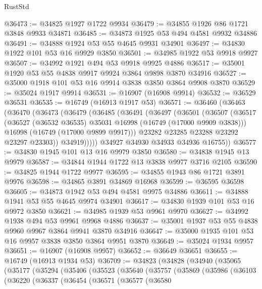 \begin{lexlean}{RustStd}
\begin{coremodule}
@36473 := @34825 @1927 @1722 @9934
@36479 := @34855 @1926 @86 @1721 @3848 @9933 @34871
@36485 := @34873 @1925 @53 @494 @4581 @9932 @34886
@36491 := @34888 @1924 @53 @55 @4645 @9931 @34901
@36497 := @34830 @1922 @101 @53 @16 @9929 @3850
@36501 := @34985 @1922 @53 @9918 @9927
@36507 := @34992 @1921 @494 @53 @9918 @9925 @4886
@36517 := @35001 @1920 @53 @55 @4838 @9917 @9924 @3864 @9898 @3870 @34916
@36527 := @35000 @1918 @101 @53 @16 @9914 @3838 @3850 @3864 @9908 @3870
@36529 := @35024 @1917 @9914
@36531 := @16907 (@16908 @9914)
@36532 := @36529 @36531
@36535 := @16749 (@16913 @1917 @53)
@36571 := @36460
    (@36463
      (@36470
        (@36473
          (@36479
            (@36485
              (@36491
                (@36497
                  (@36501
                    (@36507
                      (@36517
                        (@36527 (@36532 @36535) @35031 @16998 (@16749 (@17000 @9909 @3838)))
                        @16998
                        (@16749 (@17000 @9899 @9917)))
                      @23282
                      @23285
                      @23288
                      @23292
                      @23297
                      @23303))
                  @34919)))))
        @34927
        @34930
        @34933
        @34936
        @16755))
@36577 := @34830 @1945 @101 @13 @16 @9979 @3850
@36580 := @34838 @1945 @13 @9979
@36587 := @34844 @1944 @1722 @13 @3838 @9977 @3716 @2105
@36590 := @34825 @1944 @1722 @9977
@36595 := @34855 @1943 @86 @1721 @3891 @9976
@36598 := @34865 @3891 @34869 @16968
@36599 := @36595 @36598
@36605 := @34873 @1942 @53 @494 @4581 @9975 @34886
@36611 := @34888 @1941 @53 @55 @4645 @9974 @34901
@36617 := @34830 @1939 @101 @53 @16 @9972 @3850
@36621 := @34985 @1939 @53 @9961 @9970
@36627 := @34992 @1938 @494 @53 @9961 @9968 @4886
@36637 := @35001 @1937 @53 @55 @4838 @9960 @9967 @3864 @9941 @3870 @34916
@36647 := @35000 @1935 @101 @53 @16 @9957 @3838 @3850 @3864 @9951 @3870
@36649 := @35024 @1934 @9957
@36651 := @16907 (@16908 @9957)
@36652 := @36649 @36651
@36655 := @16749 (@16913 @1934 @53)
@36709 := @34823
    (@34828
      (@34940
        (@35065
          (@35177
            (@35294
              (@35406
                (@35523
                  (@35640
                    (@35757
                      (@35869
                        (@35986
                          (@36103
                            (@36220
                              (@36337
                                (@36454
                                  (@36571
                                    (@36577
                                      (@36580

\end{coremodule}
\end{lexlean}
